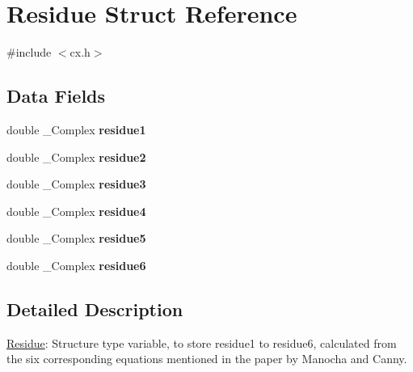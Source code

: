 \hypertarget{struct_residue}{}\section{Residue Struct Reference}
\label{struct_residue}


{\ttfamily \#include $<$cx.\+h$>$}

\subsection*{Data Fields}
\begin{DoxyCompactItemize}
\item 
\mbox{\label{struct_residue_ac9c29659e079dc6581f430fbc14e5868}} 
double \+\_\+\+Complex {\bfseries residue1}
\item 
\mbox{\label{struct_residue_a8fd51b76ab87fcccdd236a49f6702c4b}} 
double \+\_\+\+Complex {\bfseries residue2}
\item 
\mbox{\label{struct_residue_aedacac63d44a2c9da63dde018b805abb}} 
double \+\_\+\+Complex {\bfseries residue3}
\item 
\mbox{\label{struct_residue_a76d6fcce21bba06dea1562aa50eaece0}} 
double \+\_\+\+Complex {\bfseries residue4}
\item 
\mbox{\label{struct_residue_aaa02698cd0a5f95c444810d77efe8b02}} 
double \+\_\+\+Complex {\bfseries residue5}
\item 
\mbox{\label{struct_residue_a41a6f986ca1f77d6154377d9dd9f9c7f}} 
double \+\_\+\+Complex {\bfseries residue6}
\end{DoxyCompactItemize}


\subsection{Detailed Description}
\hyperlink{struct_residue}{Residue}\+: Structure type variable, to store residue1 to residue6, calculated from the six corresponding equations mentioned in the paper by Manocha and Canny.

